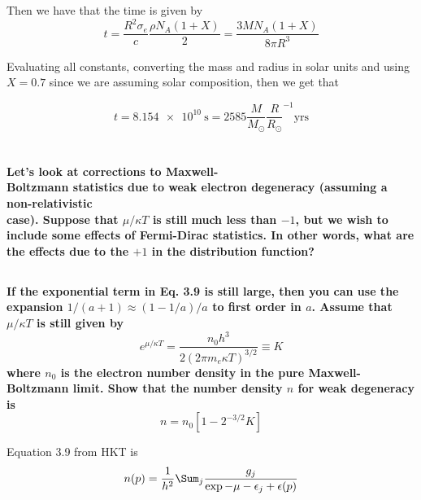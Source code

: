 Then we have that the time is given by
\begin{equation}
    t = \frac{R^2\sigma_e}{c}\frac{\rho N_A (1+X)}{2}=\frac{3MN_A(1+X)}{8\pi R^3}
\end{equation}

Evaluating all constants, converting the mass and radius in solar units and using $X=0.7$ since we are assuming solar composition, then we get that

\begin{equation}
    t = \SI{8.154e10}{\s} = 2585 \frac{M}{M_\odot}\frac{R}{R_\odot}^{-1} \text{yrs}
\end{equation}

\clearpage
\section{}
\textbf{Let's look at corrections to Maxwell- \\ Boltzmann statistics due to weak electron degeneracy (assuming a non-relativistic \\case).
Suppose that $\mu/\kappa T$ is still much less than $-1$, but we wish to include some effects of Fermi-Dirac statistics.
In other words, what are the effects due to the $+1$ in the distribution function?}
\subsection{}
\textbf{If the exponential term in Eq. 3.9 is still large, then you can use the expansion $1/(a + 1) \approx (1 - 1/a)/a$ to first order in $a$. Assume that $\mu/\kappa T$ is still given by
\begin{equation}
    e^{\mu/\kappa T} = \frac{n_0 h^3}{2(2\pi m_e \kappa T)^{3/2}} \equiv K
    \label{eq:bigK}
\end{equation}
where $n_0$ is the electron number density in the pure Maxwell-Boltzmann limit.
Show that the number density $n$ for weak degeneracy is
\begin{equation}
    n=n_0\left[1-2^{-3/2}K\right]
\end{equation}}

Equation 3.9 from HKT is
\begin{equation*}
    n(p)=\frac{1}{h^2}\Sum_j\frac{g_j}{\exp{-\mu - \epsilon_j + \epsilon(p)}}
\end{equation*}

